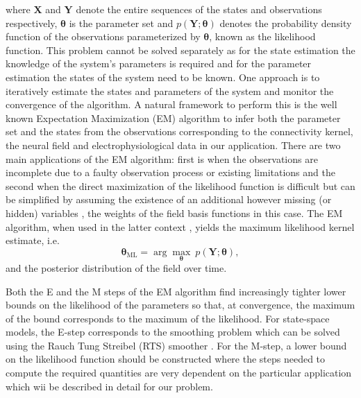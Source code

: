 \documentclass[review,authoryear,3p]{elsarticle}
\begin{document}
where $\mathbf X$ and $\mathbf Y$ denote the entire sequences of the states and observations respectively, $\boldsymbol\theta$ is the parameter set and $p(\mathbf Y;\boldsymbol\theta)$ denotes the probability density function of the observations parameterized  by $\boldsymbol\theta$, known as the likelihood function. This problem cannot be solved separately as for the state estimation the knowledge of the system's parameters is required and for the parameter estimation the states of the system need to be known. One approach is to iteratively estimate the states and parameters of the system and monitor the convergence of the algorithm. A natural framework to perform this is the well known Expectation Maximization (EM) algorithm \cite{Dempster1977,Shumway2000} to infer both the parameter set and the states from the observations corresponding to the connectivity kernel, the neural field and electrophysiological data in our application. There are two main applications of the EM algorithm:  first is when the observations are incomplete due to a faulty observation process or existing limitations and the second  when the direct maximization of the likelihood function is difficult but can be simplified by assuming the existence of an additional however missing (or hidden) variables \cite{Bilmes1998}, the weights of the field basis functions in this case. The EM algorithm, when used in the latter context \cite{Dewar2009}, yields the maximum likelihood kernel estimate, i.e.
\begin{equation}
	\boldsymbol\theta_{\text{ML}}=\arg\max_{\boldsymbol\theta}~p(\mathbf Y;\boldsymbol\theta),
 \end{equation}   
and the posterior distribution of the field over time.

Both the E and the M steps of the EM algorithm find increasingly tighter lower bounds on the likelihood of the parameters so that, at convergence, the maximum of the bound corresponds to the maximum of the likelihood. For state-space models, the E-step corresponds to the smoothing problem which can be solved using the Rauch Tung Streibel (RTS) smoother \cite{RAUCH1965}. For the M-step, a lower bound on the likelihood function should be constructed where the steps needed
to compute the required quantities are very dependent on the particular application which wii be described in detail for our problem. 
\end{document}
